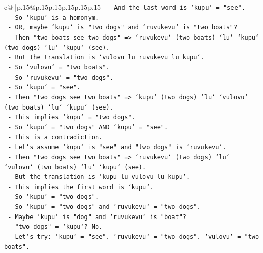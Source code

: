 \documentclass{article}
\begin{document}
{\begin{supertabular}{c@{$\;$}|p{.15\linewidth}@{}p{.15\linewidth}p{.15\linewidth}p{.15\linewidth}p{.15\linewidth}p{.15\linewidth}}
{{{\texttt{                       {-} And the last word is `kupu` = "see".} \\
\texttt{                       {-} So `kupu` is a homonym.} \\
\texttt{                       {-} OR, maybe `kupu` is "two dogs" and `ruvukevu` is "two boats"?} \\
\texttt{                       {-} Then "two boats see two dogs" => `ruvukevu` (two boats) `lu` `kupu` (two dogs) `lu` `kupu` (see).} \\
\texttt{                       {-} But the translation is `vulovu lu ruvukevu lu kupu`.} \\
\texttt{                       {-} So `vulovu` = "two boats".} \\
\texttt{                       {-} So `ruvukevu` = "two dogs".} \\
\texttt{                       {-} So `kupu` = "see".} \\
\texttt{                       {-} Then "two dogs see two boats" => `kupu` (two dogs) `lu` `vulovu` (two boats) `lu` `kupu` (see).} \\
\texttt{                       {-} This implies `kupu` = "two dogs".} \\
\texttt{                       {-} So `kupu` = "two dogs" AND `kupu` = "see".} \\
\texttt{                       {-} This is a contradiction.} \\
\texttt{                       {-} Let's assume `kupu` is "see" and "two dogs" is `ruvukevu`.} \\
\texttt{                       {-} Then "two dogs see two boats" => `ruvukevu` (two dogs) `lu` `vulovu` (two boats) `lu` `kupu` (see).} \\
\texttt{                       {-} But the translation is `kupu lu vulovu lu kupu`.} \\
\texttt{                       {-} This implies the first word is `kupu`.} \\
\texttt{                       {-} So `kupu` = "two dogs".} \\
\texttt{                       {-} So `kupu` = "two dogs" and `ruvukevu` = "two dogs".} \\
\texttt{                       {-} Maybe `kupu` is "dog" and `ruvukevu` is "boat"?} \\
\texttt{                       {-} "two dogs" = `kupu`? No.} \\
\texttt{                       {-} Let's try: `kupu` = "see". `ruvukevu` = "two dogs". `vulovu` = "two boats".} \\
}}}
\end{supertabular}}
\end{document}
